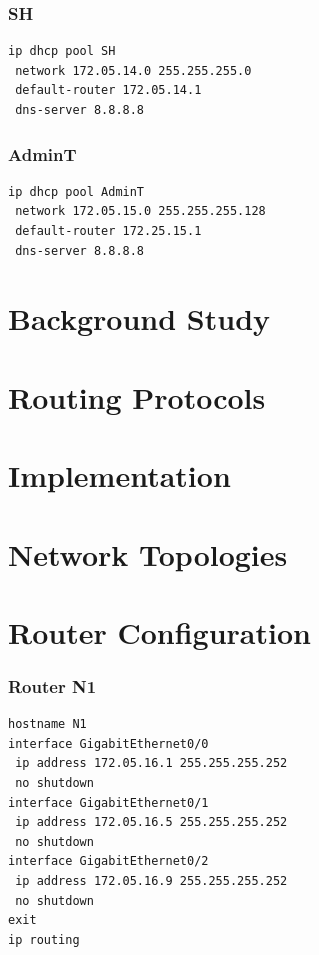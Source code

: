 \documentclass[12pt]{report}
\begin{document}
\subsection{SH}
\begin{lstlisting}[basicstyle=\ttfamily\small, frame=single]
ip dhcp pool SH
 network 172.05.14.0 255.255.255.0
 default-router 172.05.14.1
 dns-server 8.8.8.8
\end{lstlisting}

\subsection{AdminT}
\begin{lstlisting}[basicstyle=\ttfamily\small, frame=single]
ip dhcp pool AdminT
 network 172.05.15.0 255.255.255.128
 default-router 172.25.15.1
 dns-server 8.8.8.8
\end{lstlisting}
\newpage

\chapter{Background Study}
\chapter{Routing Protocols}
\chapter{Implementation}
\chapter{Network Topologies}

\chapter{Router Configuration}

\subsection{Router N1}
\begin{lstlisting}[basicstyle=\ttfamily\small, frame=single]
hostname N1
interface GigabitEthernet0/0
 ip address 172.05.16.1 255.255.255.252
 no shutdown
interface GigabitEthernet0/1
 ip address 172.05.16.5 255.255.255.252
 no shutdown
interface GigabitEthernet0/2
 ip address 172.05.16.9 255.255.255.252
 no shutdown
exit
ip routing
\end{lstlisting}
\newpage
\end{document}
